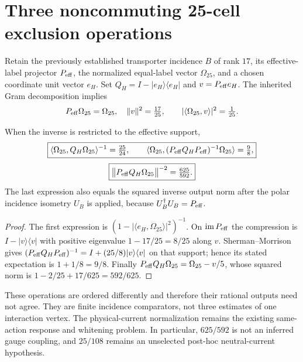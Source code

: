 \documentclass[11pt,a4paper]{article}
\begin{document}
\printbibliography

\section{Three noncommuting 25-cell exclusion operations}
\label{p5d:sec:v365-operator-ordered-exclusion}
Retain the previously established transporter incidence
$B$ of rank $17$, its effective-label projector $P_{\rm eff}$,
the normalized equal-label vector $\Omega_{25}$, and a chosen
coordinate unit vector $e_H$.  Set $Q_H=I-|e_H\rangle\langle e_H|$
and $v=P_{\rm eff}e_H$.  The inherited Gram decomposition implies
\[
P_{\rm eff}\Omega_{25}=\Omega_{25},\quad
\|v\|^2=\tfrac{17}{25},\qquad
|\langle\Omega_{25},v\rangle|^2=\tfrac1{25}.
\]
\begin{proposition}
\label{p5d:prop:v365-three-polar-factors}
When the inverse is restricted to the effective support,
\[
\boxed{\langle\Omega_{25},Q_H\Omega_{25}\rangle^{-1}
 =\tfrac{25}{24},\qquad
\langle\Omega_{25},(P_{\rm eff}Q_HP_{\rm eff})^{-1}
 \Omega_{25}\rangle=\tfrac98,}
\]
\[
\boxed{\bigl\|P_{\rm eff}Q_H\Omega_{25}\bigr\|^{-2}
 =\tfrac{625}{592}.}
\]
The last expression also equals the squared inverse output norm
after the polar incidence isometry $U_B$ is applied, because
$U_B^\dagger U_B=P_{\rm eff}$.
\end{proposition}
\begin{proof}
The first expression is $(1-|\langle e_H,\Omega_{25}\rangle|^2)^{-1}$.
On $\operatorname{im}P_{\rm eff}$ the compression is
$I-|v\rangle\langle v|$ with positive eigenvalue
$1-17/25=8/25$ along $v$.  Sherman--Morrison gives
$(P_{\rm eff}Q_HP_{\rm eff})^{-1}=I+(25/8)|v\rangle\langle v|$
on that support; hence its stated expectation is $1+1/8=9/8$.
Finally $P_{\rm eff}Q_H\Omega_{25}=\Omega_{25}-v/5$,
whose squared norm is $1-2/25+17/625=592/625$.
\end{proof}
\begin{remark}
\label{p5d:rem:v365-polar-factors-scope}
These operations are ordered differently and therefore their
rational outputs need not agree.  They are finite incidence
comparators, not three estimates of one interaction vertex.
The physical-current normalization remains the existing
same-action response and whitening problem.  In particular,
$625/592$ is not an inferred gauge coupling, and $25/108$
remains an unselected post-hoc neutral-current hypothesis.
\end{remark}
\end{document}
